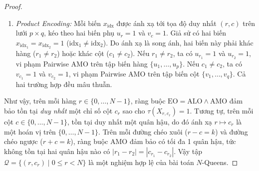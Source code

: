 \documentclass[11pt,a4paper]{article}
\begin{document}
\begin{proof}
\begin{enumerate}
    \item \textit{Product Encoding:} Mỗi biến $x_{\text{idx}}$ được ánh xạ tới tọa độ duy nhất $(r, c)$ trên lưới $p \times q$, kéo theo hai biến phụ $u_r = 1$ và $v_c = 1$. Giả sử có hai biến $x_{\text{idx}_1} = x_{\text{idx}_2} = 1$ ($\text{idx}_1 \neq \text{idx}_2$). Do ánh xạ là song ánh, hai biến này phải khác hàng ($r_1 \neq r_2$) hoặc khác cột ($c_1 \neq c_2$). Nếu $r_1 \neq r_2$, ta có $u_{r_1} = 1$ và $u_{r_2} = 1$, vi phạm Pairwise AMO trên tập biến hàng $\{u_1, \dots, u_p\}$. Nếu $c_1 \neq c_2$, ta có $v_{c_1} = 1$ và $v_{c_2} = 1$, vi phạm Pairwise AMO trên tập biến cột $\{v_1, \dots, v_q\}$. Cả hai trường hợp đều mâu thuẫn.
\end{enumerate}
Như vậy, trên mỗi hàng $r \in \{0, \dots, N-1\}$, ràng buộc $\text{EO} = \text{ALO} \land \text{AMO}$ đảm bảo tồn tại \textit{duy nhất} một chỉ số cột $c_r$ sao cho $\tau(X_{r, c_r}) = 1$. Tương tự, trên mỗi cột $c \in \{0, \dots, N-1\}$, tồn tại duy nhất một quân hậu, do đó ánh xạ $r \mapsto c_r$ là một hoán vị trên $\{0, \dots, N-1\}$. Trên mỗi đường chéo xuôi ($r - c = k$) và đường chéo ngược ($r + c = k$), ràng buộc AMO đảm bảo có tối đa 1 quân hậu, tức không tồn tại hai quân hậu nào có $|r_1 - r_2| = |c_{r_1} - c_{r_2}|$. Vậy tập $\mathcal{Q} = \{(r, c_r) \mid 0 \le r < N\}$ là một nghiệm hợp lệ của bài toán $N$-Queens.


\end{proof}
\end{document}
